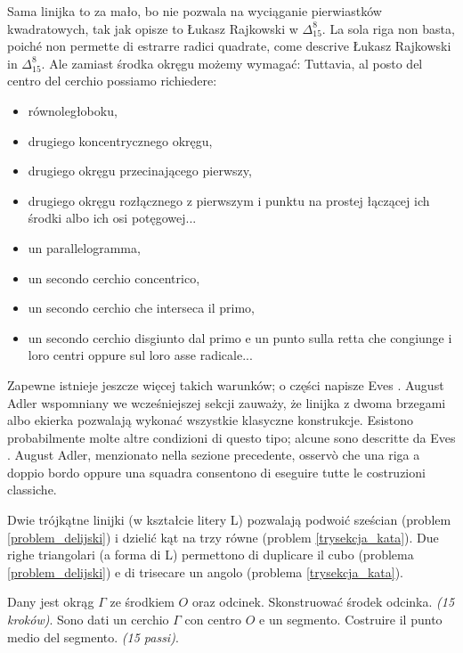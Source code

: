 Sama linijka to za mało, bo nie pozwala na wyciąganie pierwiastków kwadratowych, tak jak opisze to Łukasz Rajkowski w $\Delta_{15}^8$. %
La sola riga non basta, poiché non permette di estrarre radici quadrate, come descrive Łukasz Rajkowski in $\Delta_{15}^8$. %
%
Ale zamiast środka okręgu możemy wymagać: %
Tuttavia, al posto del centro del cerchio possiamo richiedere: %
\begin{itemize}
    \item równoległoboku, %
    \item drugiego koncentrycznego okręgu, %
    \item drugiego okręgu przecinającego pierwszy, %
    \item drugiego okręgu rozłącznego z pierwszym i punktu na prostej łączącej ich środki albo ich osi potęgowej... %
    \item un parallelogramma, %
    \item un secondo cerchio concentrico, %
    \item un secondo cerchio che interseca il primo, %
    \item un secondo cerchio disgiunto dal primo e un punto sulla retta che congiunge i loro centri oppure sul loro asse radicale... %
\end{itemize}

Zapewne istnieje jeszcze więcej takich warunków; o części napisze Eves \cite[s. 174-182]{eves1_1972}. %
August Adler wspomniany we wcześniejszej sekcji zauważy, że linijka z dwoma brzegami albo ekierka pozwalają wykonać wszystkie klasyczne konstrukcje. %
Esistono probabilmente molte altre condizioni di questo tipo; alcune sono descritte da Eves \cite[p. 174-182]{eves1_1972}. %
August Adler, menzionato nella sezione precedente, osservò che una riga a doppio bordo oppure una squadra consentono di eseguire tutte le costruzioni classiche. %

Dwie trójkątne linijki (w kształcie litery L) pozwalają podwoić sześcian (problem \ref{problem_delijski}) i dzielić kąt na trzy równe (problem \ref{trysekcja_kata}). %
Due righe triangolari (a forma di L) permettono di duplicare il cubo (problema \ref{problem_delijski}) e di trisecare un angolo (problema \ref{trysekcja_kata}). %

\begin{problem}
    Dany jest okrąg $\Gamma$ ze środkiem $O$ oraz odcinek. %
    Skonstruować środek odcinka. %
    \hfill \emph{(15 kroków)}. %
    Sono dati un cerchio $\Gamma$ con centro $O$ e un segmento. %
    Costruire il punto medio del segmento. %
    \hfill \emph{(15 passi)}. %
\end{problem}

